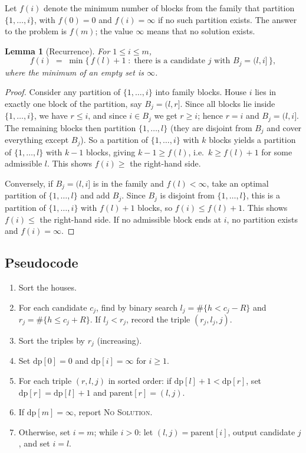 \documentclass[11pt,a4paper]{article}
\newtheorem{lemma}{Lemma}
\theoremstyle{definition}
\begin{document}
Let $f(i)$ denote the minimum number of blocks from the family that partition $\{1,\dots,i\}$, with $f(0)=0$ and $f(i)=\infty$ if no such partition exists.
The answer to the problem is $f(m)$; the value $\infty$ means that no solution exists.

\begin{lemma}[Recurrence]\label{lem:rec}
For $1 \le i \le m$,
\[
  f(i) \;=\; \min\bigl\{\, f(l) + 1 \;:\; \text{there is a candidate } j \text{ with } B_j = (l, i] \,\bigr\},
\]
where the minimum of an empty set is $\infty$.
\end{lemma}

\begin{proof}
Consider any partition of $\{1,\dots,i\}$ into family blocks. House $i$ lies in exactly one block of the partition, say $B_j = (l, r]$.
Since all blocks lie inside $\{1,\dots,i\}$, we have $r \le i$, and since $i \in B_j$ we get $r \ge i$; hence $r=i$ and $B_j = (l,i]$.
The remaining blocks then partition $\{1,\dots,l\}$ (they are disjoint from $B_j$ and cover everything except $B_j$).
So a partition of $\{1,\dots,i\}$ with $k$ blocks yields a partition of $\{1,\dots,l\}$ with $k-1$ blocks, giving $k-1 \ge f(l)$, i.e.\ $k \ge f(l)+1$ for some admissible $l$.
This shows $f(i) \ge$ the right-hand side.

Conversely, if $B_j = (l,i]$ is in the family and $f(l)<\infty$, take an optimal partition of $\{1,\dots,l\}$ and add $B_j$.
Since $B_j$ is disjoint from $\{1,\dots,l\}$, this is a partition of $\{1,\dots,i\}$ with $f(l)+1$ blocks, so $f(i) \le f(l)+1$.
This shows $f(i) \le$ the right-hand side. If no admissible block ends at $i$, no partition exists and $f(i)=\infty$.
\end{proof}

\subsection{Pseudocode}

\begin{enumerate}[nosep]
  \item Sort the houses.
  \item For each candidate $c_j$, find by binary search $l_j = \#\{h < c_j-R\}$ and $r_j = \#\{h \le c_j+R\}$. If $l_j<r_j$, record the triple $(r_j, l_j, j)$.
  \item Sort the triples by $r_j$ (increasing).
  \item Set $\mathrm{dp}[0]=0$ and $\mathrm{dp}[i]=\infty$ for $i \ge 1$.
  \item For each triple $(r,l,j)$ in sorted order: if $\mathrm{dp}[l]+1 < \mathrm{dp}[r]$, set $\mathrm{dp}[r]=\mathrm{dp}[l]+1$ and $\mathrm{parent}[r]=(l,j)$.
  \item If $\mathrm{dp}[m]=\infty$, report \textsc{No Solution}.
  \item Otherwise, set $i=m$; while $i>0$: let $(l,j)=\mathrm{parent}[i]$, output candidate $j$, and set $i=l$.
\end{enumerate}
\end{document}
